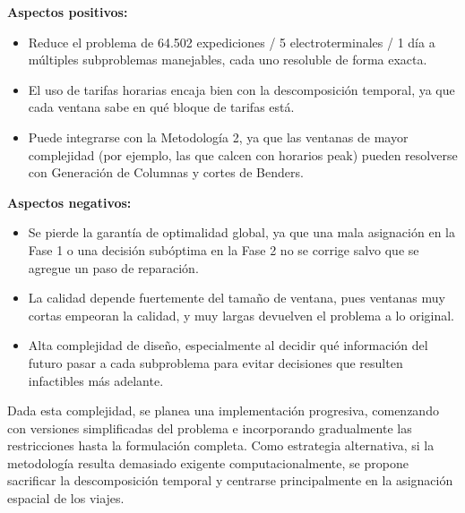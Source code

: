 \textbf{Aspectos positivos:}
\begin{itemize}
\setlength{\itemsep}{1pt}
\item Reduce el problema de 64.502 expediciones / 5 electroterminales / 1 d\'ia a m\'ultiples subproblemas manejables, cada uno resoluble de forma exacta.
\item El uso de tarifas horarias encaja bien con la descomposici\'on temporal, ya que cada ventana sabe en qu\'e bloque de tarifas est\'a.
\item Puede integrarse con la Metodolog\'ia 2, ya que las ventanas de mayor complejidad (por ejemplo, las que calcen con horarios peak) pueden resolverse con Generaci\'on de Columnas y cortes de Benders.
\end{itemize}

\textbf{Aspectos negativos:}
\begin{itemize}
\setlength{\itemsep}{1pt}
\item Se pierde la garant\'ia de optimalidad global, ya que una mala asignaci\'on en la Fase 1 o una decisi\'on sub\'optima en la Fase 2 no se corrige salvo que se agregue un paso de reparaci\'on.
\item La calidad depende fuertemente del tama\~no de ventana, pues ventanas muy cortas empeoran la calidad, y muy largas devuelven el problema a lo original.
\item Alta complejidad de dise\~no, especialmente al decidir qu\'e informaci\'on del futuro pasar a cada subproblema para evitar decisiones que resulten infactibles m\'as adelante.
\end{itemize}

Dada esta complejidad, se planea una implementaci\'on progresiva, comenzando con versiones simplificadas del problema e incorporando gradualmente las restricciones hasta la formulaci\'on completa. Como estrategia alternativa, si la metodolog\'ia resulta demasiado exigente computacionalmente, se propone sacrificar la descomposici\'on temporal y centrarse principalmente en la asignaci\'on espacial de los viajes.
